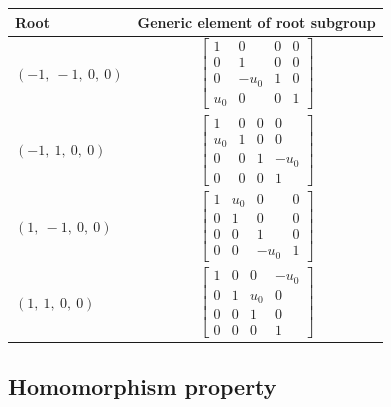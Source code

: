 \documentclass[11pt]{article}
\theoremstyle{definition}
\begin{document}
\noindent \begin{longtable}{|l|c|}
    \hline
    \textbf{Root} & \textbf{Generic element of root subgroup} \\
    \hline
    \endhead
    $\left( -1, \  -1, \  0, \  0\right)$ & ${\left[\begin{matrix}1 & 0 & 0 & 0\\0 & 1 & 0 & 0\\0 & - u_{0} & 1 & 0\\u_{0} & 0 & 0 & 1\end{matrix}\right]}$ \\
    \hline
    $\left( -1, \  1, \  0, \  0\right)$ & ${\left[\begin{matrix}1 & 0 & 0 & 0\\u_{0} & 1 & 0 & 0\\0 & 0 & 1 & - u_{0}\\0 & 0 & 0 & 1\end{matrix}\right]}$ \\
    \hline
    $\left( 1, \  -1, \  0, \  0\right)$ & ${\left[\begin{matrix}1 & u_{0} & 0 & 0\\0 & 1 & 0 & 0\\0 & 0 & 1 & 0\\0 & 0 & - u_{0} & 1\end{matrix}\right]}$ \\
    \hline
    $\left( 1, \  1, \  0, \  0\right)$ & ${\left[\begin{matrix}1 & 0 & 0 & - u_{0}\\0 & 1 & u_{0} & 0\\0 & 0 & 1 & 0\\0 & 0 & 0 & 1\end{matrix}\right]}$ \\
    \hline
\end{longtable}


\subsection{Homomorphism property}
\end{document}
